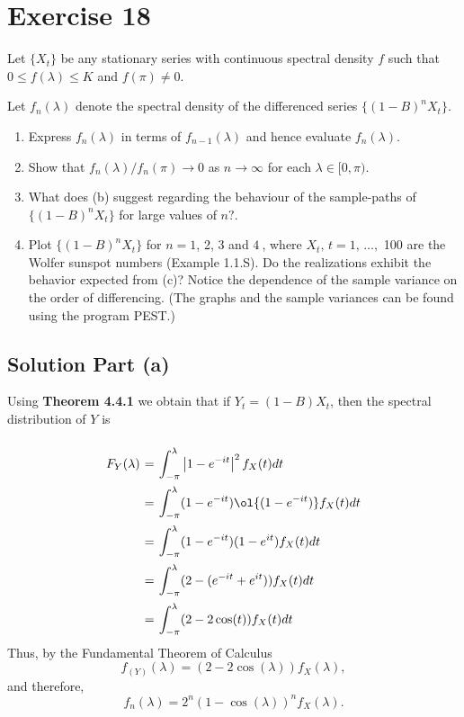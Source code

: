 \section*{Exercise 18}

Let $\{X_{t} \}$ be any stationary series with continuous spectral density $\mathit{f}$ such that $0 \leq f ( \lambda) \leq K$ and $f ( \pi) \neq0$.

Let $f_{n} ( \lambda)$ denote the spectral density of the differenced series $\{( 1-B )^{n} X_{t} \}$.
\begin{enumerate}[label=(\alph*)]
    \item  Express $f_{n} ( \lambda)$ in terms of $f_{n-1} ( \lambda)$ and hence evaluate $f_{n} ( \lambda)$.
    \item Show that $f_{n} ( \lambda) / f_{n} ( \pi) \to0$ as $n \to\infty$ for each $\lambda\in[ 0, \pi)$.
    \item What does (b) suggest regarding the behaviour of the sample-paths of $\{( 1 - B )^{n} X_{t} \}$ for large values of $n?$.
    \item Plot $\{( 1 - B )^{n} X_{t} \}$ for $n=1$, 2, 3 and $4 ~$, where $X_{t}, \, t=1, \, \ldots,$ 100 are the
    Wolfer sunspot numbers (Example 1.1.S). Do the realizations exhibit the behavior expected from (c)? Notice the dependence of the sample variance on the order of differencing. (The graphs and the sample variances can be
    found using the program PEST.)
\end{enumerate}


\subsection*{Solution Part (a)}

Using \textbf{Theorem 4.4.1} we obtain that if $Y_t = (1-B) X_t$, then the spectral distribution of $Y$ is

\[ \everymath{\displaystyle}
\arraycolsep=1.8pt\def\arraystretch{2.5}
\begin{array}{rcl}
    F_Y(\lambda) & = & \int_{-\pi}^{\lambda} \left| 1 - e^{-it} \right|^2 f_X(t) dt\\
    & = & \int_{-\pi}^{\lambda} (1-e^{-it})\ol{(1-e^{-it})}f_X(t) dt\\
    & = & \int_{-\pi}^{\lambda} (1-e^{-it})(1-e^{it})f_X(t) dt\\
    & = & \int_{-\pi}^{\lambda} (2-(e^{-it} + e^{it})) f_X(t) dt\\
    & = & \int_{-\pi}^{\lambda} (2-2\cos(t)) f_X(t) dt\\
\end{array} \]
Thus, by the Fundamental Theorem of Calculus
\[ f_(Y)(\lambda) = (2-2\cos(\lambda)) f_{X}(\lambda), \]
and therefore,
\[ f_n(\lambda) = 2^n (1-\cos(\lambda))^n f_X(\lambda). \]

